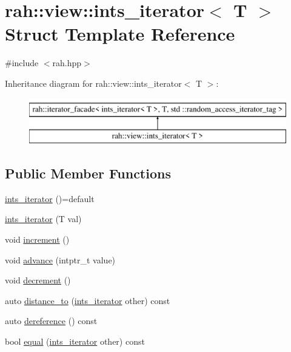 \hypertarget{structrah_1_1view_1_1ints__iterator}{}\section{rah\+::view\+::ints\+\_\+iterator$<$ T $>$ Struct Template Reference}
\label{structrah_1_1view_1_1ints__iterator}


{\ttfamily \#include $<$rah.\+hpp$>$}

Inheritance diagram for rah\+::view\+::ints\+\_\+iterator$<$ T $>$\+:\begin{figure}[H]
\begin{center}
\leavevmode
\includegraphics[height=2.000000cm]{structrah_1_1view_1_1ints__iterator}
\end{center}
\end{figure}
\subsection*{Public Member Functions}
\begin{DoxyCompactItemize}
\item 
\mbox{\hyperlink{structrah_1_1view_1_1ints__iterator_a2b0f48ff5ad3b3754ea2818bfbefa9d5}{ints\+\_\+iterator}} ()=default
\item 
\mbox{\hyperlink{structrah_1_1view_1_1ints__iterator_aff7958341e1e99c7bf232db2acbb1622}{ints\+\_\+iterator}} (T val)
\item 
void \mbox{\hyperlink{structrah_1_1view_1_1ints__iterator_a34e88e12edf3a728ee91c706749bd1c0}{increment}} ()
\item 
void \mbox{\hyperlink{structrah_1_1view_1_1ints__iterator_a0f8e2c678b31a59deaa522f967c86518}{advance}} (intptr\+\_\+t value)
\item 
void \mbox{\hyperlink{structrah_1_1view_1_1ints__iterator_a08516717bcf1a7e7569863aa05b19392}{decrement}} ()
\item 
auto \mbox{\hyperlink{structrah_1_1view_1_1ints__iterator_affcacb2301246c7c9972c06a86b952ce}{distance\+\_\+to}} (\mbox{\hyperlink{structrah_1_1view_1_1ints__iterator}{ints\+\_\+iterator}} other) const
\item 
auto \mbox{\hyperlink{structrah_1_1view_1_1ints__iterator_ae63cf37f8a217c36a69412ec4de47374}{dereference}} () const
\item 
bool \mbox{\hyperlink{structrah_1_1view_1_1ints__iterator_a5360257e3f004cd3cbbf14f779cace0b}{equal}} (\mbox{\hyperlink{structrah_1_1view_1_1ints__iterator}{ints\+\_\+iterator}} other) const
\end{DoxyCompactItemize}
